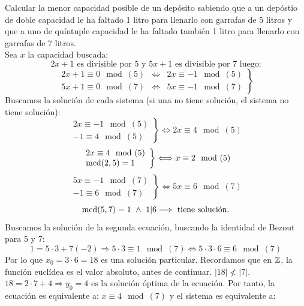 \begin{ejemplo}
    Calcular la menor capacidad posible de un depósito sabiendo que a un depóstio de doble capacidad le ha faltado 1 litro
    para llenarlo con garrafas de 5 litros y que a uno de quíntuple capacidad le ha faltado también 1 litro para llenarlo
    con garrafas de 7 litros.\\

    \noindent Sea $x$ la capacidad buscada:
    $$2x+1 \text{ es divisible por } 5 \text{ y } 5x+1 \text{ es divisible por } 7 \text{ luego:}$$
    $$\left. \begin{array}{rcl}
            2x+1 \equiv0\mod(5) & \Longleftrightarrow & 2x\equiv -1\mod(5) \\
            5x+1 \equiv0\mod(7) & \Longleftrightarrow & 5x\equiv -1\mod(7)
        \end{array} \right\}$$
    Buscamos la solución de cada sistema (si una no tiene solución, el sistema no tiene solución):
    $$\left. \begin{array}{l}
            2x \equiv -1 \mod (5) \\
            -1 \equiv 4 \mod (5)
    \end{array} \right\} \Longleftrightarrow 2x\equiv 4\mod(5)$$
    $$\left. \begin{array}{l}
            2x \equiv 4\mod(5) \\
            \operatorname{mcd}(2,5) = 1
        \end{array} \right\} \Longleftrightarrow x\equiv 2\mod(5)$$
    $$\left. \begin{array}{l}
            5x\equiv -1 \mod(7) \\
            -1\equiv 6\mod(7)
        \end{array} \right\} \Longleftrightarrow 5x\equiv 6\mod(7)$$
    $$\operatorname{mcd}(5,7)=1 \ \land \  1|6 \Longrightarrow \text{ tiene solución.}$$
    Buscamos la solución de la segunda ecuación, buscando la identidad de Bezout para 5 y 7:
    $$1 = 5\cdot 3 + 7(-2) \Longrightarrow 5\cdot 3 \equiv 1\mod(7) \Longleftrightarrow 5\cdot 3\cdot 6\equiv 6 \mod(7)$$
    Por lo que $x_0=3\cdot 6=18$ es una solución particular.\newline
    Recordamos que en $\mathbb Z$, la función euclídea es el valor absoluto, antes de continuar.\newline
    $|18|\not <|7|$. $18=2\cdot 7 + 4 \Longrightarrow y_0=4$ es la solución óptima de la ecuación.\newline
    Por tanto, la ecuación es equivalente a: $x\equiv 4\mod(7)$ y el sistema es equivalente a:


\end{ejemplo}
